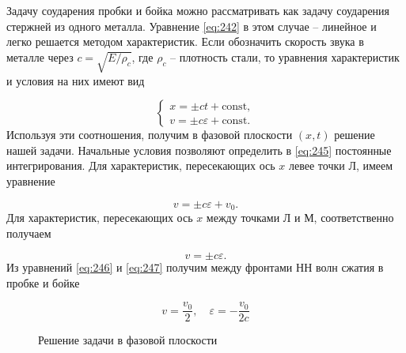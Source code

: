 \documentclass[specialist, subf, href, colorlinks=true, 14pt, final]{disser}
\theoremstyle{definition}
\newcommand{\const}{\text{const}}
\begin{document}
Задачу соударения пробки и бойка можно рассматривать как задачу соударения стержней из одного металла. Уравнение \eqref{eq:242} в этом случае -- линейное и легко решается методом характеристик. Если обозначить скорость звука в металле через $c = \sqrt{E/ \rho_c}$, где $\rho_c$ -- плотность стали, то уравнения характеристик и условия на
них имеют вид
\addtocounter{equation}{1}
\begin{equation}\label{eq:245}
	 \left\{
	 	\begin{array}{l}
	 		x = \pm ct + \const,\\
	 		v = \pm c \varepsilon + \const.
	 	\end{array}
	 \right.
	\tag{5}
\end{equation} 
Используя эти соотношения, получим в фазовой плоскости $(x, t)$ решение нашей задачи. Начальные условия позволяют определить в \eqref{eq:245} постоянные интегрирования. Для характеристик, пересекающих ось $x$ левее точки Л, имеем уравнение
\addtocounter{equation}{1}
\begin{equation}\label{eq:246}
	 v = \pm c \varepsilon + v_0.
	\tag{6}
\end{equation} 
Для характеристик, пересекающих ось $x$ между точками Л и М, соответственно получаем
\addtocounter{equation}{1}
\begin{equation}\label{eq:247}
	 v = \pm c \varepsilon .
	\tag{7}
\end{equation} 
Из уравнений \eqref{eq:246} и \eqref{eq:247} получим между фронтами НН волн сжатия в пробке и бойке
\addtocounter{equation}{1}
\begin{equation}\label{eq:248}
	 v = \frac{v_0}{2}, \quad \varepsilon = - \frac{v_0}{2 c}
	\tag{8}
\end{equation} 
\begin{figure}[!htp]
  \caption{Решение задачи в фазовой плоскости}
  \label{2-4-2}
\end{figure}
\end{document}
